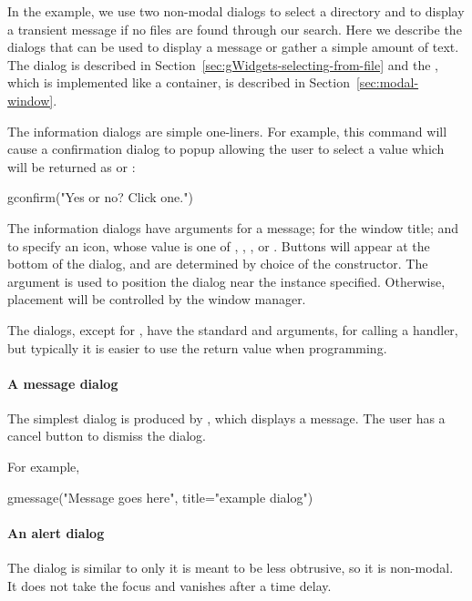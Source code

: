 In the example, we use two non-modal dialogs  to
select a directory and  to display a transient message if
no files are found through our search.  Here we describe the dialogs
that can be used to display a message or gather a simple amount of
text. The  dialog is described in
Section~\ref{sec:gWidgets-selecting-from-file} and the
, which is implemented like a container, is
described in Section~\ref{sec:modal-window}.


The information dialogs are simple one-liners. For example, this
command will cause a confirmation dialog to popup allowing the user to
select a value which will be returned as  or :
\begin{Schunk}
\begin{Sinput}
 gconfirm("Yes or no? Click one.")
\end{Sinput}
\end{Schunk}


The information dialogs have arguments 
for a message;  for the window title; and
 to specify an icon, whose value is one of
, , , or
. Buttons will appear at the bottom of the dialog, and
are determined by choice of the constructor. The
 argument is used to position the dialog
near the  instance specified. Otherwise, placement will
be controlled by the window manager.

The dialogs, except for , have the standard
 and  arguments, for calling a handler, but
typically it is easier to use the return value when programming.

\paragraph{A message dialog}
The simplest dialog is produced by , which
displays a message. The user has a cancel button to dismiss the dialog.


For example,
\begin{Schunk}
\begin{Sinput}
 gmessage("Message goes here", title="example dialog")
\end{Sinput}
\end{Schunk}


\paragraph{An alert dialog}
The  dialog is similar to  only it is
meant to be less obtrusive, so it is non-modal. It does not take the
focus and vanishes after a time delay.

